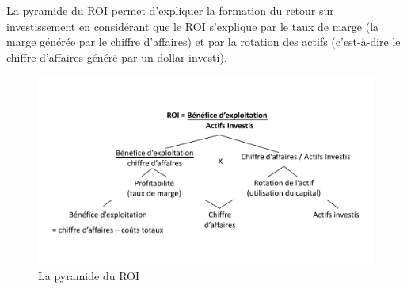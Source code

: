 \documentclass{tufte-handout}
\begin{document}
\begin{enumerate}
La pyramide du ROI permet d'expliquer la formation du retour sur investissement en considérant que le ROI s'explique par le taux de marge (la marge générée par le chiffre d'affaires) et par la rotation des actifs (c'est-à-dire le chiffre d'affaires généré par un dollar investi).\\
\begin{figure}[htbp]
\centering
\includegraphics[width=.9\linewidth]{./img/roi.pdf}
\caption{La pyramide du ROI}
\end{figure}


\end{enumerate}
\end{document}
